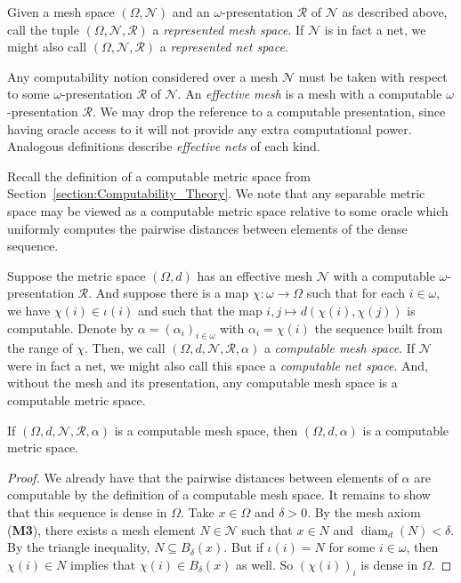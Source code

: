 Given a mesh space $(\Omega, \mathcal{N})$ and an $\omega$-presentation $\mathscr{R}$ of $\mathcal{N}$ as described above, call the tuple $(\Omega, \mathcal{N}, \mathscr{R})$ a \textit{represented mesh space}. If $\mathcal{N}$ is in fact a net, we might also call $(\Omega, \mathcal{N}, \mathscr{R})$ a \textit{represented net space}.

Any computability notion considered over a mesh $\mathcal{N}$ must be taken with respect to some $\omega$-presentation $\mathscr{R}$ of $\mathcal{N}$. An \textit{effective mesh} is a mesh with a computable $\omega$-presentation $\mathscr{R}$. We may drop the reference to a computable presentation, since having oracle access to it will not provide any extra computational power. Analogous definitions describe \textit{effective nets} of each kind. 

Recall the definition of a computable metric space from Section~\ref{section:Computability_Theory}. We note that any separable metric space may be viewed as a computable metric space relative to some oracle which uniformly computes the pairwise distances between elements of the dense sequence.

Suppose the metric space $(\Omega, d)$ has an effective mesh $\mathcal{N}$ with a computable $\omega$-presentation $\mathscr{R}$. And suppose there is a map $\chi : \omega \to \Omega$ such that for each $i \in \omega$, we have $\chi(i) \in \iota(i)$ and such that the map $i, j \mapsto d(\chi(i), \chi(j))$ is computable. Denote by $\alpha = (\alpha_i)_{i \in \omega}$ with $\alpha_i = \chi(i)$ the sequence built from the range of $\chi$. Then, we call $(\Omega, d, \mathcal{N}, \mathscr{R}, \alpha)$ a \textit{computable mesh space}. If $\mathscr{N}$ were in fact a net, we might also call this space a \textit{computable net space}. And, without the mesh and its presentation, any computable mesh space is a computable metric space. 

\begin{proposition}
    If $(\Omega, d, \mathcal{N}, \mathscr{R}, \alpha)$ is a computable mesh space, then $(\Omega, d, \alpha)$ is a computable metric space.
\end{proposition}
\begin{proof}
    We already have that the pairwise distances between elements of $\alpha$ are computable by the definition of a computable mesh space. It remains to show that this sequence is dense in $\Omega$. Take $x \in \Omega$ and $\delta > 0$. By the mesh axiom (\textbf{M3}), there exists a mesh element $N \in \mathcal{N}$ such that $x \in N$ and $\operatorname{diam}_d(N) < \delta$. By the triangle inequality, $N \subseteq B_\delta(x)$. But if $\iota(i) = N$ for some $i \in \omega$, then $\chi(i) \in N$ implies that $\chi(i) \in B_\delta(x)$ as well. So $(\chi(i))_i$ is dense in $\Omega$.
\end{proof}

